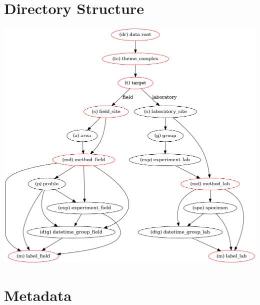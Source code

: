 \documentclass[fontsize=12]{scrartcl}
\begin{document}
\section{Directory Structure}
\includegraphics[width=\textwidth]{dirtree.png}

\clearpage
\section{Metadata}
{\footnotesize

}
\end{document}
